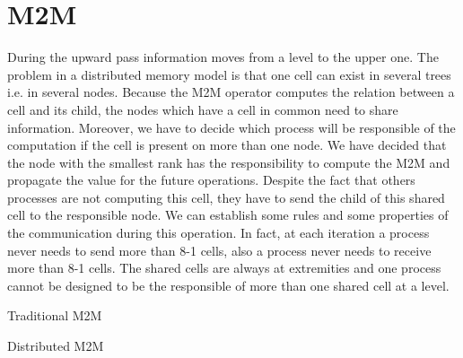 \documentclass[12pt,letterpaper,titlepage]{report}
\begin{document}
\section{M2M}
During the upward pass information moves from a level to the upper one.
The problem in a distributed memory model is that one cell can exist in several trees i.e. in several nodes.
Because the M2M operator computes the relation between a cell and its child, the nodes which have a cell in common need to share information.
Moreover, we have to decide which process will be responsible of the computation if the cell is present on more than one node.
We have decided that the node with the smallest rank has the responsibility to compute the M2M and propagate the value for the future operations.
Despite the fact that others processes are not computing this cell, they have to send the child of this shared cell to the responsible node.
We can establish some rules and some properties of the communication during this operation.
In fact, at each iteration a process never needs to send more than 8-1 cells, also a process never needs to receive more than 8-1 cells.
The shared cells are always at extremities and one process cannot be designed to be the responsible of more than one shared cell at a level.
\begin{algorithm}[H]
\linesnumbered
\SetLine
{}
\BlankLine
{}
\BlankLine
\caption{Traditional M2M}
\end{algorithm}
\begin{algorithm}[H]
\linesnumbered
\SetLine
{}
\BlankLine
{}
\BlankLine
\caption{Distributed M2M}
\end{algorithm}
\end{document}
